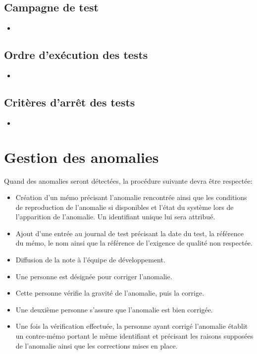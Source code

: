 \documentclass{../res/univ-projet}
\begin{document}
\subsection{Campagne de test}
\begin{itemize}
 \item 
\end{itemize}

\subsection{Ordre d'exécution des tests}
\begin{itemize}
 \item 
\end{itemize}

\subsection{Critères d'arrêt des tests}
\begin{itemize}
 \item 
\end{itemize}


\section{Gestion des anomalies}

Quand des anomalies seront détectées, la procédure suivante devra être respectée:
  \begin{itemize}
   \item Création d'un mémo précisant l'anomalie rencontrée ainsi que les conditions de reproduction de l'anomalie si disponibles et l'état du système lors de l'apparition de l'anomalie.  
   Un identifiant unique lui sera attribué.
   \item Ajout d'une entrée au journal de test précisant la date du test, la référence du mémo, le nom ainsi que la référence de l'exigence de 
   qualité non respectée.
   \item Diffusion de la note à l'équipe de développement.
   \item Une personne est désignée pour corriger l'anomalie.
   \item Cette personne vérifie la gravité de l'anomalie, puis la corrige.
   \item Une deuxième personne s'assure que l'anomalie est bien corrigée.
   \item Une fois la vérification effectuée, la personne ayant corrigé l'anomalie établit un contre-mémo portant le même identifiant et précisant les raisons supposées 
   de l'anomalie ainsi que les corrections mises en place.
  \end{itemize}
  
\end{document}

